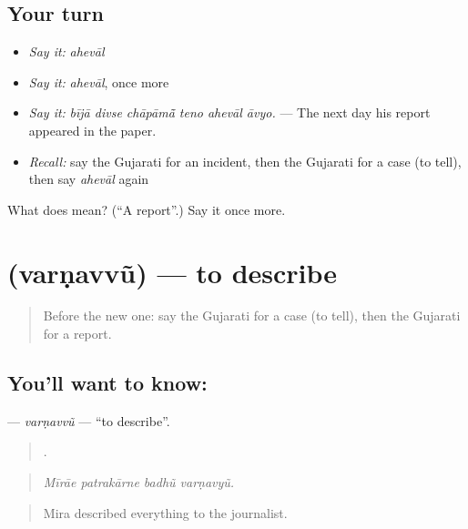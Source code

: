 \subsection*{Your turn}
\begin{itemize}
\raggedright
  \item \emph{Say it:} \emph{ahevāl}
  \item \emph{Say it:} \emph{ahevāl}, once more
  \item \emph{Say it:} \emph{bījā divse chāpāmā̃ teno ahevāl āvyo.} — The next day his report appeared in the paper.
  \item \emph{Recall:} say the Gujarati for an incident, then the Gujarati for a case (to tell), then say \emph{ahevāl} again
\end{itemize}

\begin{tcolorbox}[breakable,colback=teal!4,colframe=teal!35!black,title={Before you move on}]
What does  mean? (\textquotedblleft{}A report\textquotedblright{}.) Say it once more.
\end{tcolorbox}
\section[\texorpdfstring{\gu{વર્ણવવું} (varṇavvũ)}{વર્ણવવું (varṇavvũ)}]{ (varṇavvũ) — to describe}

\label{lesson:GU-C312-varnavvu}



\begin{quote}
Before the new one: say the Gujarati for a case (to tell), then the Gujarati for a report.
\end{quote}

\subsection*{You'll want to know: }
\textbf{} — \emph{varṇavvũ} — \textquotedblleft{}to describe\textquotedblright{}.

\begin{quote}
   .
\end{quote}

\begin{quote}
\emph{Mīrāe patrakārne badhũ varṇavyũ.}
\end{quote}

\begin{quote}
Mira described everything to the journalist.
\end{quote}

